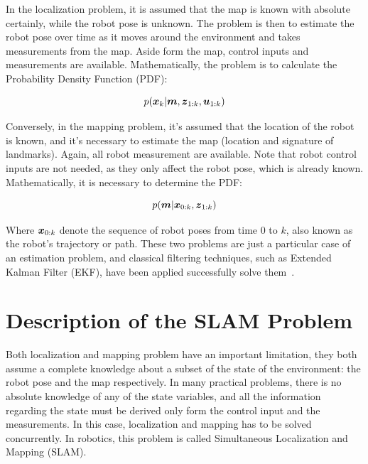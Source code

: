 In the localization problem, it is assumed that the map is known with absolute certainly, while the robot pose is unknown. The problem is then to estimate the robot pose over time as it moves around the environment and takes measurements from the map. Aside form the map, control inputs and measurements are available. Mathematically, the problem is to calculate the Probability Density Function (PDF):

\begin{equation}
p(\boldsymbol{x}_k|\boldsymbol{m},\boldsymbol{z}_{1:k},\boldsymbol{u}_{1:k})
\end{equation}  

Conversely, in the mapping problem, it's assumed that the location of the robot is known, and it's necessary to estimate the map (location and signature of landmarks). Again, all robot measurement are available. Note that robot control inputs are not needed, as they only affect the robot pose, which is already known. Mathematically, it is necessary to determine the PDF:

\begin{equation}
p(\boldsymbol{m}|\boldsymbol{x}_{0:k},\boldsymbol{z}_{1:k})
\end{equation} 

Where $\boldsymbol{x}_{0:k}$ denote the sequence of robot poses from time $0$ to $k$, also known as the robot's trajectory or path. These two problems are just a particular case of an estimation problem, and classical filtering techniques, such as Extended Kalman Filter (EKF), have been applied successfully solve them~\cite{probabilistic}.  

\section{Description of the SLAM Problem}
\label{sec:slam-description}

Both localization and mapping problem have an important limitation, they both assume a complete knowledge about a subset of the state of the environment: the robot pose and the map respectively. In many practical problems, there is no absolute knowledge of any of the state variables, and all the information regarding the state must be derived only form the control input and the measurements. In this case, localization and mapping has to be solved concurrently. In robotics, this problem is called Simultaneous Localization and Mapping (SLAM). 


